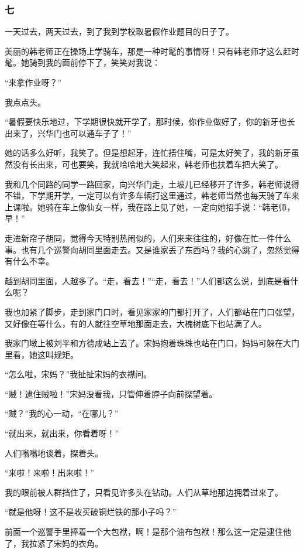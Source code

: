 \subsubsection*{七}


\par 一天过去，两天过去，到了我到学校取暑假作业题目的日子了。
\par 美丽的韩老师正在操场上学骑车，那是一种时髦的事情呀！只有韩老师才这么赶时髦。她骑到我的面前停下了，笑笑对我说：
\par “来拿作业呀？”
\par 我点点头。
\par “暑假要快乐地过，下学期很快就开学了，那时候，你作业做好了，你的新牙也长出来了，兴华门也可以通车子了！”
\par 她的话多么好听，我笑了。但是想起牙，连忙捂住嘴，可是太好笑了，我的新牙虽然没有长出来，可也要笑，我就哈哈地大笑起来，韩老师也扶着车把大笑了。
\par 我和几个同路的同学一路回家，向兴华门走，土坡儿已经移开了许多，韩老师说得不错，下学期开学，一定可以有许多车辆打这里通过，韩老师当然也每天骑了车来上课啦。她骑在车上像仙女一样，我在路上见了她，一定向她招手说：“韩老师，早！”
\par 走进新帘子胡同，觉得今天特别热闹似的，人们来来往往的，好像在忙一件什么事。也有几个巡警向胡同里面走去。又是谁家丢了东西吗？我的心跳了，忽然觉得有什么不幸。
\par 越到胡同里面，人越多了。“走，看去！”“走，看去！”人们都这么说，到底是看什么呢？
\par 我也加紧了脚步，走到家门口时，看见家家的门都打开了，人们都站在门口张望，又好像在等什么，有的人就往空草地那面走去，大槐树底下也站满了人。
\par 我家门墩上被刘平和方德成站上去了。宋妈抱着珠珠也站在门口，妈妈可躲在大门里看，她这叫规矩。
\par “怎么啦，宋妈？”我扯扯宋妈的衣襟问。
\par “贼！逮住贼啦！”宋妈没看我，只管伸着脖子向前探望着。
\par “贼？”我的心一动，“在哪儿？”
\par “就出来，就出来，你看着呀！”
\par 人们嗡嗡地谈着，探着头。
\par “来啦！来啦！出来啦！”
\par 我的眼前被人群挡住了，只看见许多头在钻动。人们从草地那边拥着过来了。
\par “就是他呀！这不是收买破铜烂铁的那小子吗？”
\par 前面一个巡警手里捧着一个大包袱，啊！是那个油布包袱！那么这一定是逮住他了，我拉紧了宋妈的衣角。
